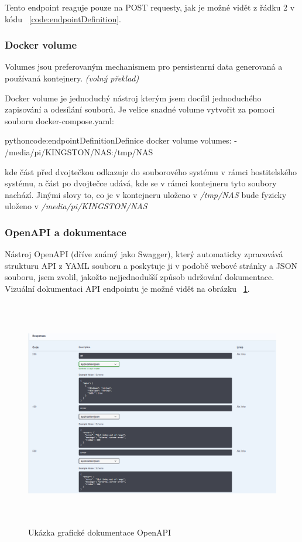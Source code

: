 \documentclass[
  glossaries,
]{kidiplom}
\begin{document}
Tento endpoint reaguje pouze na POST requesty, jak je možné vidět z řádku 2 v kódu 
~\ref{code:endpointDefinition}.

\subsubsection{Docker volume}
Volumes jsou preferovaným mechanismem pro persistenrní data generovaná a používaná kontejnery. \cite{DOCKERvolume} \textit {(volný překlad)}

Docker volume je jednoduchý nástroj kterým jsem docílil jednoduchého zapisování a odesílání souborů. Je velice snadné volume vytvořit za pomoci souboru docker-compose.yaml:
\begin{kicode}{python}{code:endpointDefinition}{Definice docker volume}
        volumes:
            - /media/pi/KINGSTON/NAS:/tmp/NAS
\end{kicode}
kde část před dvojtečkou odkazuje do souborového systému v rámci hostitelského systému, a část po dvojtečce udává, kde se v rámci kontejneru tyto soubory nachází. Jinými slovy to, co je v kontejneru uloženo v \textit {/tmp/NAS} bude fyzicky uloženo v \textit {/media/pi/KINGSTON/NAS}

\subsubsection{OpenAPI a dokumentace}
Nástroj OpenAPI (dříve známý jako Swagger), který automaticky zpracovává strukturu API z YAML souboru a poskytuje ji v podobě webové stránky a JSON souboru, jsem zvolil, jakožto nejjednodušší způsob udržování dokumentace. Vizuální dokumentaci API endpointu je možné vidět na obrázku ~\ref{fig:openapi}.


\begin{figure}[htp]
    \centering
    \includegraphics[width=14cm,height=10cm,keepaspectratio]{openapi}
    \caption{Ukázka grafické dokumentace OpenAPI}
    \label{fig:openapi}
\end{figure}
\clearpage
\end{document}
